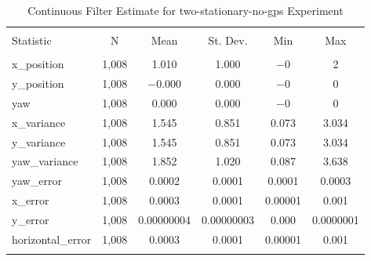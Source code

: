
\begin{table}[h] \centering 
  \caption{Continuous Filter Estimate for two-stationary-no-gps Experiment} 
  \label{tab:two_stationary_no_gps_continuous_summary} 
\begin{tabular}{@{\extracolsep{5pt}}lccccc} 
\\[-1.8ex]\hline 
\hline \\[-1.8ex] 
Statistic & \multicolumn{1}{c}{N} & \multicolumn{1}{c}{Mean} & \multicolumn{1}{c}{St. Dev.} & \multicolumn{1}{c}{Min} & \multicolumn{1}{c}{Max} \\ 
\hline \\[-1.8ex] 
x\_position & 1,008 & 1.010 & 1.000 & $-$0 & 2 \\ 
y\_position & 1,008 & $-$0.000 & 0.000 & $-$0 & 0 \\ 
yaw & 1,008 & 0.000 & 0.000 & $-$0 & 0 \\ 
x\_variance & 1,008 & 1.545 & 0.851 & 0.073 & 3.034 \\ 
y\_variance & 1,008 & 1.545 & 0.851 & 0.073 & 3.034 \\ 
yaw\_variance & 1,008 & 1.852 & 1.020 & 0.087 & 3.638 \\ 
yaw\_error & 1,008 & 0.0002 & 0.0001 & 0.0001 & 0.0003 \\ 
x\_error & 1,008 & 0.0003 & 0.0001 & 0.00001 & 0.001 \\ 
y\_error & 1,008 & 0.00000004 & 0.00000003 & 0.000 & 0.0000001 \\ 
horizontal\_error & 1,008 & 0.0003 & 0.0001 & 0.00001 & 0.001 \\ 
\hline \\[-1.8ex] 
\end{tabular} 
\end{table} 
